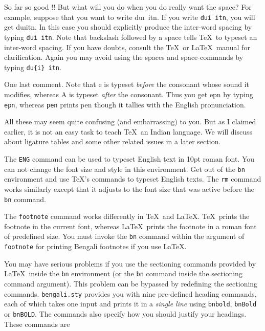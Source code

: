 So far so good !! But what will you do when you do really want the space?
For example, suppose that you want to write {\bn du\i\ itn}.
If you write {\tt du\bs i itn}, you will get
{\bn du\i itn}. In this case you should explicitly produce the
inter-word spacing by typing {\tt  du\bs i\bs\ itn}.
Note that backslash followed by a space tells \TeX\ to typeset an
inter-word spacing. If you have doubts, consult the \TeX\ or \LaTeX\
manual for clarification. Again you may avoid using the
spaces and space-commands by typing
{\tt du\{\bs i\} itn}.

One last comment. Note that {\bn e} is typeset {\em before} the consonant
whose sound it modifies, whereas {\bn A} is typeset {\em after} the
consonant. Thus you get {\bn epn} by typing {\tt epn}, whereas
{\tt pen} prints {\bn pen} though it
tallies with the English pronunciation.

All these may seem quite confusing (and embarrassing) to you. But as I claimed
earlier, it is not an easy task to teach \TeX\ an Indian language. We will
discuss about ligature tables and some other related issues in a later section.

The {\tt \bs ENG} command can be used to typeset English text in
10pt roman font. You can not change the font size and style in this
environment. Get out of the {\tt \bs bn} environment and use
\TeX's commands to typeset English texts. The {\tt \bs rm} command
works similarly except that it adjusts to the font size that was active
before the {\tt \bs bn} command.

The {\tt \bs footnote} command works differently in \TeX\ and \LaTeX.
\TeX\ prints the footnote in the current font, whereas \LaTeX\ prints
the footnote in a roman font of predefined size. You must invoke the
{\tt \bs bn} command within the argument of {\tt \bs footnote} for
printing Bengali footnotes if you use \LaTeX.

You may have serious
problems if you use the sectioning commands provided by \LaTeX\
inside the {\tt \bs bn} environment (or the {\tt \bs bn} command inside
the sectioning command argument). This problem can be
bypassed by redefining the sectioning commands. {\tt bengali.sty} provides
you with nine pre-defined heading commands, each of which takes one input and
prints it in a {\em single line}
using {\tt\bs bnbold}, {\tt\bs bnBold} or {\tt\bs bnBOLD}.
The commands also specify how you should justify your headings.
These commands are

